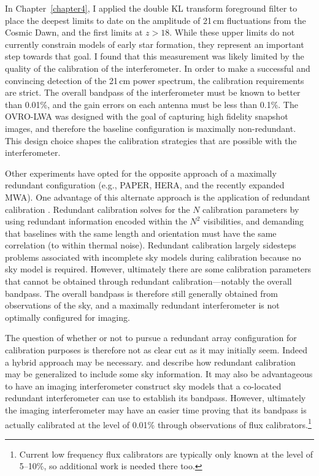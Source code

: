 \begin{bibunit}
In Chapter~\ref{chapter4}, I applied the double KL transform foreground filter to place the deepest
limits to date on the amplitude of 21\,cm fluctuations from the Cosmic Dawn, and the first limits at
$z > 18$. While these upper limits do not currently constrain models of early star formation, they
represent an important step towards that goal. I found that this measurement was likely limited by
the quality of the calibration of the interferometer.  In order to make a successful and convincing
detection of the 21\,cm power spectrum, the calibration requirements are strict. The overall
bandpass of the interferometer must be known to better than 0.01\%, and the gain errors on each
antenna must be less than 0.1\%. The OVRO-LWA was designed with the goal of capturing high fidelity
snapshot images, and therefore the baseline configuration is maximally non-redundant. This design
choice shapes the calibration strategies that are possible with the interferometer.

Other experiments have opted for the opposite approach of a maximally redundant configuration (e.g.,
PAPER, HERA, and the recently expanded MWA). One advantage of this alternate approach is the
application of redundant calibration \citep{2010MNRAS.408.1029L}. Redundant calibration solves for
the $N$ calibration parameters by using redundant information encoded within the $N^2$ visibilities,
and demanding that baselines with the same length and orientation must have the same correlation (to
within thermal noise). Redundant calibration largely sidesteps problems associated with incomplete
sky models during calibration because no sky model is required. However, ultimately there are some
calibration parameters that cannot be obtained through redundant calibration---notably the overall
bandpass. The overall bandpass is therefore still generally obtained from observations of the sky,
and a maximally redundant interferometer is not optimally configured for imaging.

The question of whether or not to pursue a redundant array configuration for calibration purposes is
therefore not as clear cut as it may initially seem.  Indeed a hybrid approach may be necessary.
\citet{2010MNRAS.408.1029L} and \citet{2017arXiv170101860S} describe how redundant calibration may
be generalized to include some sky information.  It may also be advantageous to have an imaging
interferometer construct sky models that a co-located redundant interferometer can use to establish
its bandpass. However, ultimately the imaging interferometer may have an easier time proving that
its bandpass is actually calibrated at the level of 0.01\% through observations of flux
calibrators.\footnote{
    Current low frequency flux calibrators are typically only known at the level of 5--10\%, so
    additional work is needed there too.
}


\end{bibunit}

